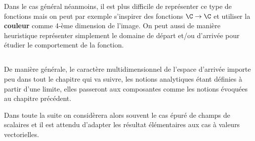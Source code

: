 Dans le cas général néanmoins, il est plus difficile de représenter ce type de fonctions mais on peut par exemple s'inspirer des fonctions \(\C \rightarrow \C\) et utiliser la \textbf{couleur} comme 4-ème dimension de l'image. On peut aussi de manière heuristique représenter simplement le domaine de départ et/ou d'arrivée pour étudier le comportement de la fonction.
\subsection*{}
De manière générale, le caractère multidimensionnel de l'espace d'arrivée importe peu dans tout le chapitre qui va suivre, les notions analytiques étant définies à partir d'une limite, elles passeront aux composantes comme les notions évoquées au chapitre précédent.\<

Dans toute la suite on considèrera alors souvent le cas épuré de champs de scalaires et il est attendu d'adapter les résultat élémentaires aux cas à valeurs vectorielles.
